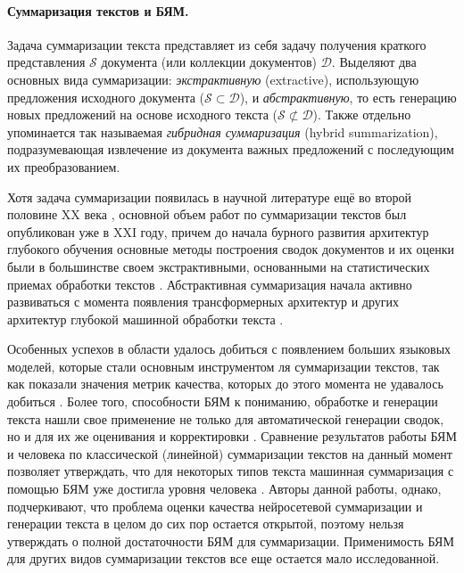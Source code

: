 \documentclass[12pt]{article}
\newcommand{\D}{\mathcal{D}}
\renewcommand{\S}{\mathcal{S}}
\begin{document}
\paragraph{Суммаризация текстов и БЯМ.} Задача суммаризации текста представляет из себя задачу получения краткого представления $\S$ документа (или коллекции документов) $\D$. Выделяют два основных вида суммаризации: \textit{экстрактивную} (extractive), использующую предложения исходного документа ($\S\subset\D$), и \textit{абстрактивную}, то есть генерацию новых предложений на основе исходного текста ($\S\not\subset\D$). Также отдельно упоминается так называемая \textit{гибридная суммаризация} (hybrid summarization), подразумевающая извлечение из документа важных предложений с последующим их преобразованием. 

Хотя задача суммаризации появилась в научной литературе ещё во второй половине XX века \cite{luhn1958automatic}, основной объем работ по суммаризации текстов был опубликован уже в XXI году, причем до начала бурного развития архитектур глубокого обучения основные методы построения сводок документов и их оценки были в большинстве своем экстрактивными, основанными на статистических приемах обработки текстов \cite{allahyari2017text}. Абстрактивная суммаризация начала активно развиваться с момента появления трансформерных архитектур и других архитектур глубокой машинной обработки текста \cite{el2021automatic}. 

Особенных успехов в области удалось добиться с появлением больших языковых моделей, которые стали основным инструментом ля суммаризации текстов, так как показали значения метрик качества, которых до этого момента не удавалось добиться \cite{jin2024comprehensive}. Более того, способности БЯМ к пониманию, обработке и генерации текста нашли свое применение не только для автоматической генерации сводок, но и для их же оценивания и корректировки \cite{wu2023large}. Сравнение результатов работы БЯМ и человека по классической (линейной) суммаризации текстов на данный момент позволяет утверждать, что для некоторых типов текста машинная суммаризация с помощью БЯМ уже достигла уровня человека \cite{pu2023summarization}. Авторы данной работы, однако, подчеркивают, что проблема оценки качества нейросетевой суммаризации и генерации текста в целом до сих пор остается открытой, поэтому нельзя утверждать о полной достаточности БЯМ для суммаризации. Применимость БЯМ для других видов суммаризации текстов все еще остается мало исследованной.
\end{document}
